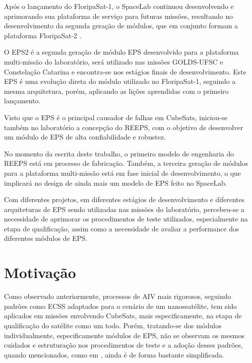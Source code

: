 Após o lançamento do FloripaSat-1, o SpaceLab continuou desenvolvendo e aprimorando sua plataforma de serviço para futuras missões, resultando no desenvolvimento da segunda geração de módulos, que em conjunto formam a plataforma FloripaSat-2 \cite{floripasat2}.

O \gls{EPS2} é a segunda geração de módulo \gls{EPS} desenvolvido para a plataforma multi-missão do laboratório, será utilizado nas missões GOLDS-UFSC e Constelação Catarina e encontra-se nos estágios finais de desenvolvimento. Este \gls{EPS} é uma evolução direta do módulo utilizado no FloripaSat-1, seguindo a mesma arquitetura, porém, aplicando as lições aprendidas com o primeiro lançamento.

Visto que o \gls{EPS} é o principal causador de falhas em CubeSats, iniciou-se também no laboratório a concepção do \gls{REEPS}, com o objetivo de desenvolver um módulo de \gls{EPS} de alta confiabilidade e robustez.

No momento da escrita deste trabalho, o primeiro modelo de engenharia do \gls{REEPS} está em processo de fabricação.
Também, a terceira geração de módulos para a plataforma multi-missão está em fase inicial de desenvolvimento, o que implicará no design de ainda mais um modelo de \gls{EPS} feito no SpaceLab.

Com diferentes projetos, em diferentes estágios de desenvolvimento e diferentes arquiteturas de \gls{EPS} sendo utilizadas nas missões do laboratório, percebeu-se a necessidade de aprimorar os procedimentos de teste utilizados, especialmente na etapa de qualificação, assim como a necessidade de avaliar a performance dos diferentes módulos de \gls{EPS}.

\section{Motivação}\label{sec:intro-motivacao}

Como observado anteriormente, processos de \gls{AIV} mais rigorosos, seguindo padrões como \gls{ECSS} adaptados para o cenário de um nanossatélite, tem sido aplicados em missões envolvendo CubeSats, mais especificamente, na etapa de qualificação do satélite como um todo.
Porém, tratando-se dos módulos individualmente, especificamente módulos de EPS, não se observam os mesmos cuidados e estruturação nos procedimentos de teste e a adoção desses padrões, quando mencionados, como em \textcite{mist-eps}, ainda é de forma bastante simplificada.


